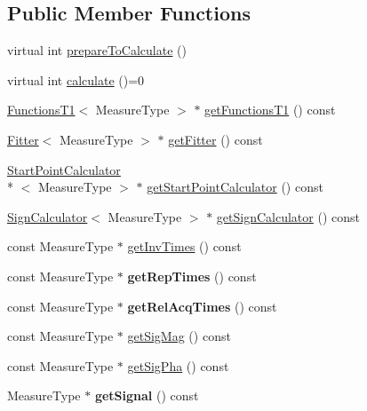 \subsection*{Public Member Functions}
\begin{DoxyCompactItemize}
\item 
virtual int \hyperlink{class_ox_1_1_calculator_t1_af8b7d97caa1f197c937942c8ebc5ae7b}{prepare\-To\-Calculate} ()
\item 
virtual int \hyperlink{class_ox_1_1_calculator_t1_ab8d5ec3f03e070ca11d3accb59a92299}{calculate} ()=0
\item 
\hyperlink{class_ox_1_1_functions_t1}{Functions\-T1}$<$ Measure\-Type $>$ $\ast$ \hyperlink{class_ox_1_1_calculator_t1_a34cee88c8f78b6486ebbfc910559717b}{get\-Functions\-T1} () const 
\item 
\hyperlink{class_ox_1_1_fitter}{Fitter}$<$ Measure\-Type $>$ $\ast$ \hyperlink{class_ox_1_1_calculator_t1_a57f0218fb065b685f4ed5f80051517bd}{get\-Fitter} () const 
\item 
\hyperlink{class_ox_1_1_start_point_calculator}{Start\-Point\-Calculator}\\*
$<$ Measure\-Type $>$ $\ast$ \hyperlink{class_ox_1_1_calculator_t1_a2ee52aac70f34defc99373d5f9f1ed8a}{get\-Start\-Point\-Calculator} () const 
\item 
\hyperlink{class_ox_1_1_sign_calculator}{Sign\-Calculator}$<$ Measure\-Type $>$ $\ast$ \hyperlink{class_ox_1_1_calculator_t1_affc80bde70a6f44f2474e9e0606ba3e0}{get\-Sign\-Calculator} () const 
\item 
const Measure\-Type $\ast$ \hyperlink{class_ox_1_1_calculator_t1_a7179ab384f0ff7f9bf28dc492672da00}{get\-Inv\-Times} () const 
\item 
\hypertarget{class_ox_1_1_calculator_t1_aaa68c32a3bba3f994cf00f5c41551952}{const Measure\-Type $\ast$ {\bfseries get\-Rep\-Times} () const }\label{class_ox_1_1_calculator_t1_aaa68c32a3bba3f994cf00f5c41551952}

\item 
\hypertarget{class_ox_1_1_calculator_t1_ac75dbb9b03f6350c19c1551c2bd4bf47}{const Measure\-Type $\ast$ {\bfseries get\-Rel\-Acq\-Times} () const }\label{class_ox_1_1_calculator_t1_ac75dbb9b03f6350c19c1551c2bd4bf47}

\item 
const Measure\-Type $\ast$ \hyperlink{class_ox_1_1_calculator_t1_a7a8fbda407b35212f781640e7cee9f2c}{get\-Sig\-Mag} () const 
\item 
const Measure\-Type $\ast$ \hyperlink{class_ox_1_1_calculator_t1_a1208138a5257482a5f3acc308f3bfd5a}{get\-Sig\-Pha} () const 
\item 
\hypertarget{class_ox_1_1_calculator_t1_a7048aabe616f4ab4b0746d07b38acfa5}{Measure\-Type $\ast$ {\bfseries get\-Signal} () const }\label{class_ox_1_1_calculator_t1_a7048aabe616f4ab4b0746d07b38acfa5}


\end{DoxyCompactItemize}
